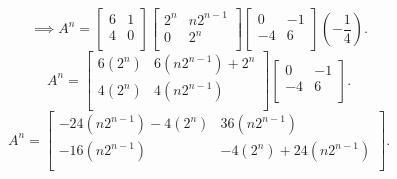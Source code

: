 \documentclass{report}
\begin{document}
{      \[
      \implies A ^{n} = \begin{bmatrix}
      6 & 1\\
      4 & 0\\
      \end{bmatrix} \begin{bmatrix}
      2^{n} & n 2 ^{n-1}\\
      0 & 2 ^{n}\\
      \end{bmatrix} \begin{bmatrix}
      0 & -1\\
      -4 & 6\\
      \end{bmatrix} \left( - \frac{1}{4} \right) 
      .\] 
      \[
      A ^{n} =  \begin{bmatrix}
      6 \left( 2 ^{n} \right)  & 6 \left(  n 2 ^{n-1} \right) + 2 ^{n}\\
       4 \left( 2 ^{n} \right) & 4 \left( n 2 ^{n-1} \right) \\
      \end{bmatrix}       \begin{bmatrix}
      0 & -1\\
      -4 & 6\\
      \end{bmatrix}
      .\] 
      \[
      A ^{n} = \begin{bmatrix}
      -24 \left( n 2 ^{n-1} \right) -4 \left( 2^{n} \right)  & 36 \left( n 2 ^{n-1} \right) \\
       -16 \left( n 2 ^{n-1} \right) & -4 \left( 2^{n} \right) + 24 \left( n 2 ^{n-1} \right) \\
      \end{bmatrix}
      .\] 
   }
\end{document}

